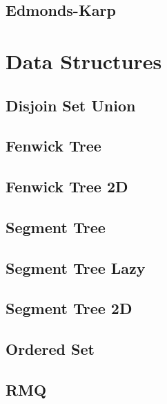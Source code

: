 \subsection{Edmonds-Karp}
\raggedbottom
\hrulefill

\section{Data Structures}
\subsection{Disjoin Set Union}
\raggedbottom
\hrulefill
\subsection{Fenwick Tree}
\raggedbottom
\hrulefill
\subsection{Fenwick Tree 2D}
\raggedbottom
\hrulefill
\subsection{Segment Tree}
\raggedbottom
\hrulefill
\subsection{Segment Tree Lazy}
\raggedbottom
\hrulefill
\subsection{Segment Tree 2D}
\raggedbottom
\hrulefill
\subsection{Ordered Set}
\raggedbottom
\hrulefill
\subsection{RMQ}
\raggedbottom
\hrulefill
